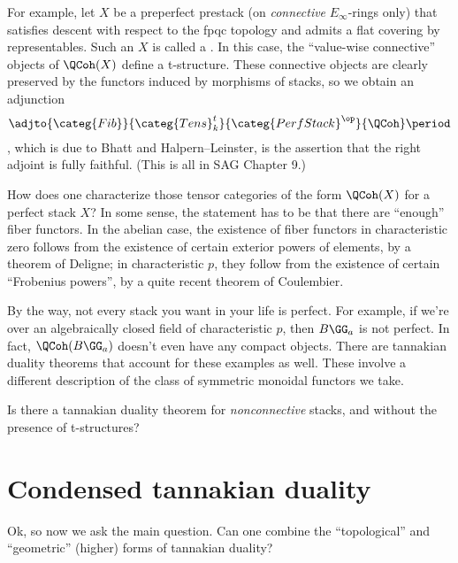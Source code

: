 \documentclass[leqno]{article}
\begin{document}
For example, let \(X\) be a preperfect prestack
(on \emph{connective} \(E_{\infty}\)-rings only)
that satisfies descent with respect to the fpqc topology and
admits a flat covering by representables.
Such an \(X\) is called a .
In this case, the \enquote{value-wise connective} objects
of \(\QCoh(X)\) define a t-structure.
These connective objects are clearly preserved by the functors
induced by morphisms of stacks, so we obtain an adjunction
\begin{equation*}
    \adjto{\categ{Fib}}{\categ{Tens}^{t}_k}
    {\categ{PerfStack}^{\op}}{\QCoh} \period
\end{equation*}
,
which is due to Bhatt and Halpern--Leinster,
is the assertion that the right adjoint is fully faithful.
(This is all in SAG Chapter 9.)

\begin{qst}
    How does one characterize those tensor categories of the form
    \(\QCoh(X)\) for a perfect stack \(X\)?
    In some sense, the statement has to be that there are
    \enquote{enough} fiber functors.
    In the abelian case, the existence of fiber functors
    in characteristic zero follows from the existence
    of certain exterior powers of elements,
    by a theorem of Deligne;
    in characteristic \(p\), they follow from the existence
    of certain \enquote{Frobenius powers},
    by a quite recent theorem of Coulembier.
\end{qst}

By the way, not every stack you want in your life is perfect.
For example, if we're over an algebraically closed field
of characteristic \(p\), then \(B\GG_a\) is not perfect.
In fact, \(\QCoh(B\GG_a)\) doesn't even have any compact objects.
There are tannakian duality theorems that
account for these examples as well.
These involve a different description of
the class of symmetric monoidal functors we take.

\begin{qst}
    Is there a tannakian duality theorem for \emph{nonconnective}
    stacks, and without the presence of t-structures?
\end{qst}

\section{Condensed tannakian duality}%
\label{condensedtannakian}

Ok, so now we ask the main question.
Can one combine the \enquote{topological} and \enquote{geometric}
(higher) forms of tannakian duality?
\end{document}
